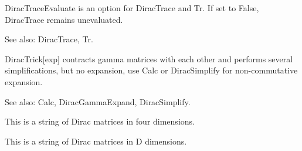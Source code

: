 







DiracTraceEvaluate is an option for DiracTrace and Tr. If set to False, DiracTrace remains unevaluated.

See also: DiracTrace, Tr.



DiracTrick[exp] contracts gamma matrices with each other and performs several simplifications, but no expansion, use Calc or
  DiracSimplify for non-commutative expansion.



See also:  Calc, DiracGammaExpand, DiracSimplify.


This is a string of Dirac matrices in four dimensions. 




\dispSFoutmath{
-2\multsp {{\gamma }^{\nu }}
}

This is a string of Dirac matrices in D dimensions. 



